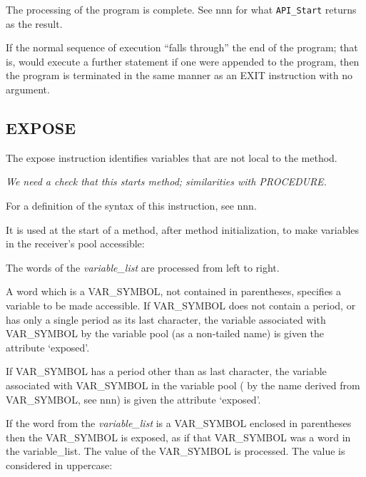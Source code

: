 The processing of the program is complete. See nnn for what
\texttt{API\_Start} returns as the result.

If the normal sequence of execution ``falls through'' the end of the
program; that is, would execute a further statement if one were appended
to the program, then the program is terminated in the same manner as an
EXIT instruction with no argument.

\subsection{EXPOSE}\label{expose}

The expose instruction identifies variables that are not local to the
method.

\emph{We need a check that this starts method; similarities with
PROCEDURE.}

For a definition of the syntax of this instruction, see nnn.

It is used at the start of a method, after method initialization, to
make variables in the receiver's pool accessible:



The words of the \emph{variable\_list} are processed from left to right.

A word which is a VAR\_SYMBOL, not contained in parentheses, specifies a
variable to be made accessible. If VAR\_SYMBOL does not contain a
period, or has only a single period as its last character, the variable
associated with VAR\_SYMBOL by the variable pool (as a non-tailed name)
is given the attribute `exposed'.



If VAR\_SYMBOL has a period other than as last character, the variable
associated with VAR\_SYMBOL in the variable pool ( by the name derived
from VAR\_SYMBOL, see nnn) is given the attribute `exposed'.



If the word from the \emph{variable\_list} is a VAR\_SYMBOL enclosed in
parentheses then the VAR\_SYMBOL is exposed, as if that VAR\_SYMBOL was
a word in the variable\_list. The value of the VAR\_SYMBOL is processed.
The value is considered in uppercase:

